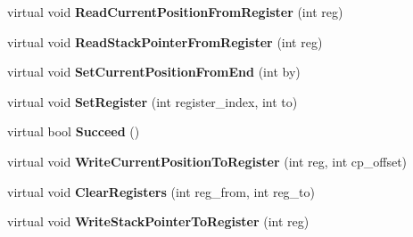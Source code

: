 \begin{DoxyCompactItemize}
\item 
virtual void {\bfseries Read\+Current\+Position\+From\+Register} (int reg)\hypertarget{classv8_1_1internal_1_1_reg_exp_macro_assembler_m_i_p_s_a3db856debb66a86b0b999760078fc9e2}{}\label{classv8_1_1internal_1_1_reg_exp_macro_assembler_m_i_p_s_a3db856debb66a86b0b999760078fc9e2}

\item 
virtual void {\bfseries Read\+Stack\+Pointer\+From\+Register} (int reg)\hypertarget{classv8_1_1internal_1_1_reg_exp_macro_assembler_m_i_p_s_a5f13f6d69555eafd3532f64d2ea443a0}{}\label{classv8_1_1internal_1_1_reg_exp_macro_assembler_m_i_p_s_a5f13f6d69555eafd3532f64d2ea443a0}

\item 
virtual void {\bfseries Set\+Current\+Position\+From\+End} (int by)\hypertarget{classv8_1_1internal_1_1_reg_exp_macro_assembler_m_i_p_s_a005d180b2c2a25be9adada6ceea905c7}{}\label{classv8_1_1internal_1_1_reg_exp_macro_assembler_m_i_p_s_a005d180b2c2a25be9adada6ceea905c7}

\item 
virtual void {\bfseries Set\+Register} (int register\+\_\+index, int to)\hypertarget{classv8_1_1internal_1_1_reg_exp_macro_assembler_m_i_p_s_ace49e35921054598366cc061597be4ff}{}\label{classv8_1_1internal_1_1_reg_exp_macro_assembler_m_i_p_s_ace49e35921054598366cc061597be4ff}

\item 
virtual bool {\bfseries Succeed} ()\hypertarget{classv8_1_1internal_1_1_reg_exp_macro_assembler_m_i_p_s_a46808edf5f7a5f7ba71b8caedb66aa0a}{}\label{classv8_1_1internal_1_1_reg_exp_macro_assembler_m_i_p_s_a46808edf5f7a5f7ba71b8caedb66aa0a}

\item 
virtual void {\bfseries Write\+Current\+Position\+To\+Register} (int reg, int cp\+\_\+offset)\hypertarget{classv8_1_1internal_1_1_reg_exp_macro_assembler_m_i_p_s_af342e57819b985ea254b8bcd994505e0}{}\label{classv8_1_1internal_1_1_reg_exp_macro_assembler_m_i_p_s_af342e57819b985ea254b8bcd994505e0}

\item 
virtual void {\bfseries Clear\+Registers} (int reg\+\_\+from, int reg\+\_\+to)\hypertarget{classv8_1_1internal_1_1_reg_exp_macro_assembler_m_i_p_s_ab12457b77455544117c217d04628a2d4}{}\label{classv8_1_1internal_1_1_reg_exp_macro_assembler_m_i_p_s_ab12457b77455544117c217d04628a2d4}

\item 
virtual void {\bfseries Write\+Stack\+Pointer\+To\+Register} (int reg)\hypertarget{classv8_1_1internal_1_1_reg_exp_macro_assembler_m_i_p_s_a842cf0974df70e03bbfeef991faa5840}{}\label{classv8_1_1internal_1_1_reg_exp_macro_assembler_m_i_p_s_a842cf0974df70e03bbfeef991faa5840}


\end{DoxyCompactItemize}
